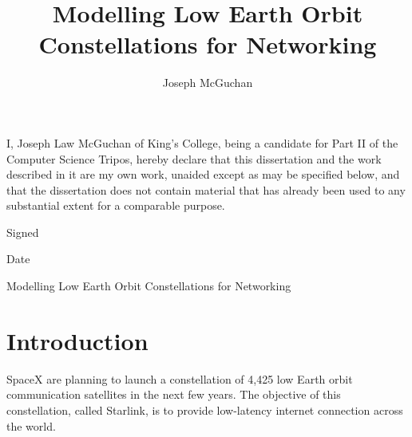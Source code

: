 \documentclass[12pt]{article}
\begin{document}
\title{Modelling Low Earth Orbit Constellations for Networking}
\author{Joseph McGuchan}
\maketitle
\thispagestyle{empty}


\newpage


I, Joseph Law McGuchan of King's College, being a candidate for Part II of the Computer Science Tripos, hereby declare that this dissertation and the work described in it are my own work, unaided except as may be specified below, and that the dissertation does not contain material that has already been used to any substantial extent for a comparable purpose.

Signed %

Date %

\newpage


Modelling Low Earth Orbit Constellations for Networking

\newpage

\tableofcontents

\section{Introduction}

SpaceX are planning to launch a constellation of 4,425 low Earth orbit communication satellites in the next few years. The objective of this constellation, called Starlink, is to provide low-latency internet connection across the world.
\end{document}
